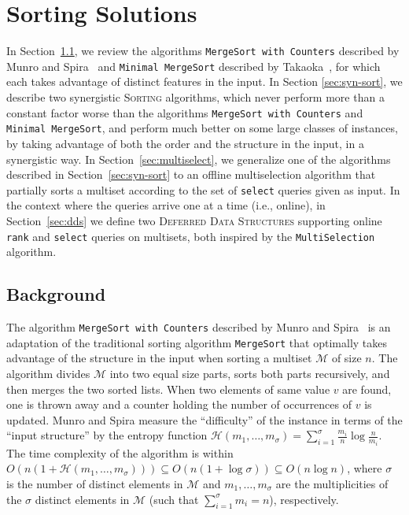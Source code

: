 \section{Sorting Solutions}
\label{sec:sort}

In Section~\ref{sec:back}, we review the algorithms \texttt{MergeSort
  with Counters} described by Munro and
Spira~\cite{1976-JComp-SortingAndSearchingInMultisets-MunroSpira} and
\texttt{Minimal MergeSort} described by
Takaoka~\cite{2009-Chapter-PartialSolutionAndEntropy-Takaoka}, for
which each takes advantage of distinct features in the input. In
Section \ref{sec:syn-sort}, we describe two synergistic
\textsc{Sorting} algorithms, which never perform more than a constant
factor worse than the algorithms \texttt{MergeSort with Counters} and
\texttt{Minimal MergeSort}, and perform much better on some large
classes of instances, by taking advantage of both the order and the
structure in the input, in a synergistic way. In
Section~\ref{sec:multiselect}, we generalize one of the algorithms
described in Section~\ref{sec:syn-sort} to an offline multiselection
algorithm that partially sorts a multiset according to the set of
\texttt{select} queries given as input. In the context where the
queries arrive one at a time (i.e., online), in
Section~\ref{sec:dds} we define two \textsc{Deferred Data Structures}
supporting online \texttt{rank} and \texttt{select} queries on
multisets, both inspired by the \texttt{MultiSelection} algorithm.

\subsection{Background}
\label{sec:back}

The algorithm \texttt{MergeSort with Counters} described by Munro and
Spira~\cite{1976-JComp-SortingAndSearchingInMultisets-MunroSpira} is
an adaptation of the traditional sorting algorithm \texttt{MergeSort}
that optimally takes advantage of the structure in the input when
sorting a multiset $\mathcal{M}$ of size $n$. The algorithm divides
$\mathcal{M}$ into two equal size parts, sorts both parts recursively,
and then merges the two sorted lists. When two elements of same value $v$ are
found, one is thrown away and a counter holding the number of occurrences
of $v$ is updated. Munro and Spira measure the
``difficulty'' of the instance in terms of the ``input structure'' by
the entropy function
$\mathcal{H}(m_1, \dots, m_\sigma) =
\sum_{i=1}^\sigma{\frac{m_i}{n}}\log{\frac{n}{m_i}}$.  The time
complexity of the algorithm is within
$O(n(1 + \mathcal{H}(m_1, \dots, m_\sigma))) \subseteq
O(n(1{+}\log{\sigma})) \subseteq O(n\log{n})$, where $\sigma$ is the
number of distinct elements in $\mathcal{M}$ and
$m_1, \dots, m_\sigma$ are the multiplicities of the $\sigma$ distinct
elements in $\mathcal{M}$ (such that $\sum_{i=1}^\sigma {m_i}=n$),
respectively.


